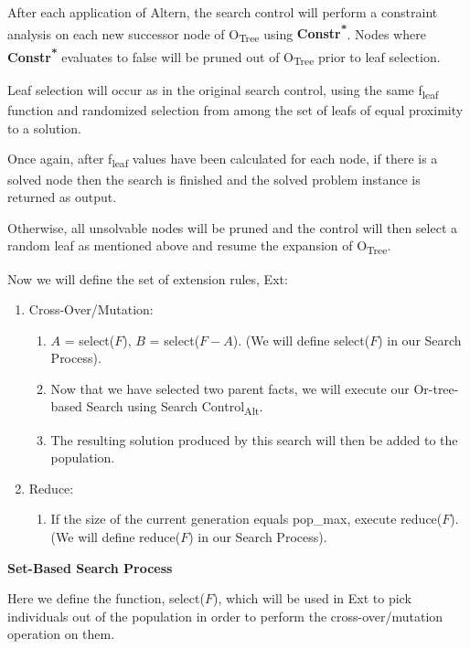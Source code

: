 \documentclass[11pt, oneside]{article}   	%
\newenvironment{cmr}{\fontfamily{cmr}\selectfont}{\par}
\begin{document}
\noindent After each application of Altern, the search control will perform a constraint analysis on each new successor node of O\textsubscript{Tree} using \textbf{Constr\textsuperscript{*}}.
Nodes where \textbf{Constr\textsuperscript{*}} evaluates to false will be pruned out of O\textsubscript{Tree} prior to leaf selection.

\noindent Leaf selection will occur as in the original search control, using the same f\textsubscript{leaf} function and randomized selection from among the set of leafs of equal proximity to a solution.

\begin{cmr}
\noindent Once again, after f\textsubscript{leaf} values have been calculated for each node, if there is a solved node then the search is finished and the solved problem instance is returned as output.

\noindent Otherwise, all unsolvable nodes will be pruned and the control will then select a random leaf as mentioned above and resume the expansion of O\textsubscript{Tree}.
\end{cmr}

\noindent Now we will define the set of extension rules, Ext:
\begin{enumerate} [topsep=0pt, itemsep=0pt, leftmargin=*]
\item Cross-Over/Mutation:
	\begin{enumerate}[leftmargin=*]
	\item $A$ = select($F$), $B$ = select($F - A$). (We will define select($F$) in our Search Process).
	\item Now that we have selected two parent facts, we will execute our Or-tree-based Search using Search Control\textsubscript{Alt}.
	\item The resulting solution produced by this search will then be added to the population.
	\end{enumerate} 
\item Reduce:
	\begin{enumerate}
	\item If the size of the current generation equals pop_max, execute reduce($F$). (We will define reduce($F$) in our Search Process).
	\end{enumerate}
\end{enumerate}
\newpage

\noindent \textbf{Set-Based Search Process}

\noindent Here we define the function, select($F$), which will be used in Ext to pick individuals out of the population in order to perform the cross-over/mutation operation on them.
\end{document}
